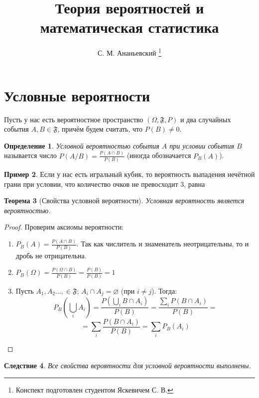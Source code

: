 \documentclass[11pt,openany,a4paper]{scrartcl}
\author{С. М. Ананьевский \thanks{Конспект подготовлен студентом Яскевичем С. В.}}
\title{Теория вероятностей и математическая статистика}
\theoremstyle{plain}
\newtheorem{theorem}{Теорема}[section]
\newtheorem{corollary}[theorem]{Следствие}
\theoremstyle{definition}
\newtheorem{definition}[theorem]{Определение}
\newtheorem{example}[theorem]{Пример}
\begin{document}
\maketitle

\tableofcontents

\pagebreak

\section{Условные вероятности}

Пусть у нас есть вероятностное пространство $(\Omega, \mathfrak{F}, P)$ и два случайных 
события $A,B \in \mathfrak{F}$, причём будем считать, что $P(B) \neq 0$.

\begin{definition}
    \emph{Условной вероятностью события $A$ при условии события $B$} называется число
    $P(A/B) = \frac{P(A \cap B)}{P(B)}$ (иногда обозначается $P_B(A)$).
\end{definition}
\begin{example}
    Если у нас есть игральный кубик, то вероятность выпадения нечётной грани при 
    условии, что количество очков не превосходит $3$, равна
\end{example}

\begin{theorem}[Свойства условной вероятности]
    Условная вероятность является вероятностью.
\end{theorem}
\begin{proof}
    Проверим аксиомы вероятности:
    \begin{enumerate}
        \item $P_B(A) =  \frac{P(A \cap B)}{P(B)}$. Так как числитель и знаменатель 
        неотрицательны, то и дробь не отрицательна.
        \item $P_B(\Omega) = \frac{P(\Omega \cap B)}{P(B)} =  \frac{P(B)}{P(B)} = 1$
        \item Пусть $A_1, A_2 \ldots, \in \mathfrak{F}$;
        $A_i \cap A_j = \varnothing$ (при $i \neq j$). Тогда:
        $$
        P_B(\bigcup\limits_i A_i) =
        \frac{P(\bigcup\limits_i B\cap A_i)}{P(B)} =
        \frac{\sum\limits_i P(B \cap A_i)}{P(B)} =
        $$
        $$
        = \sum\limits_i \frac{P(B\cap A_i)}{P(B)} = \sum\limits_i P_B(A_i)
        $$
        
    \end{enumerate}
\end{proof}
\begin{corollary}
    Все свойства вероятности для условной вероятности выполнены.
\end{corollary}
\end{document}
